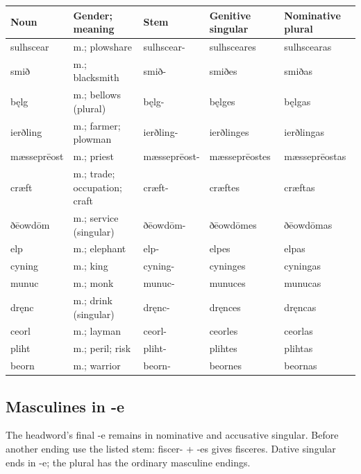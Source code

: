 \par\begingroup
\fontsize{10.5}{13.2}\selectfont
\setlength{\LTleft}{0pt}\setlength{\LTright}{\fill}
\noindent
\begin{tabular}{@{}>{\raggedright\arraybackslash}p{21.3mm}>{\raggedright\arraybackslash}p{20mm}>{\raggedright\arraybackslash}p{22.3mm}>{\raggedright\arraybackslash}p{24.6mm}>{\raggedright\arraybackslash}p{24.55mm}@{}}
\toprule
\textbf{Noun} & \textbf{Gender; meaning} & \textbf{Stem} & \textbf{Genitive singular} & \textbf{Nominative plural} \\
\midrule
sulhscear & m.; plowshare & sulhscear- & sulhsceares & sulhscearas \\
smið & m.; blacksmith & smið- & smiðes & smiðas \\
bęlg & m.; bellows (plural) & bęlg- & bęlges & bęlgas \\
ierðling & m.; farmer; plowman & ierðling- & ierðlinges & ierðlingas \\
mæsseprēost & m.; priest & mæsseprēost- & mæsseprēostes & mæsseprēostas \\
cræft & m.; trade; occupation; craft & cræft- & cræftes & cræftas \\
ðēowdōm & m.; service (singular) & ðēowdōm- & ðēowdōmes & ðēowdōmas \\
elp & m.; elephant & elp- & elpes & elpas \\
cyning & m.; king & cyning- & cyninges & cyningas \\
munuc & m.; monk & munuc- & munuces & munucas \\
dręnc & m.; drink (singular) & dręnc- & dręnces & dręncas \\
ceorl & m.; layman & ceorl- & ceorles & ceorlas \\
pliht & m.; peril; risk & pliht- & plihtes & plihtas \\
beorn & m.; warrior & beorn- & beornes & beornas \\
\bottomrule
\end{tabular}
\par\endgroup

\subsection*{Masculines in -e}

The headword’s final -e remains in nominative and accusative singular. Before another ending use the listed stem: fiscer- + -es gives fisceres. Dative singular ends in -e; the plural has the ordinary masculine endings.

